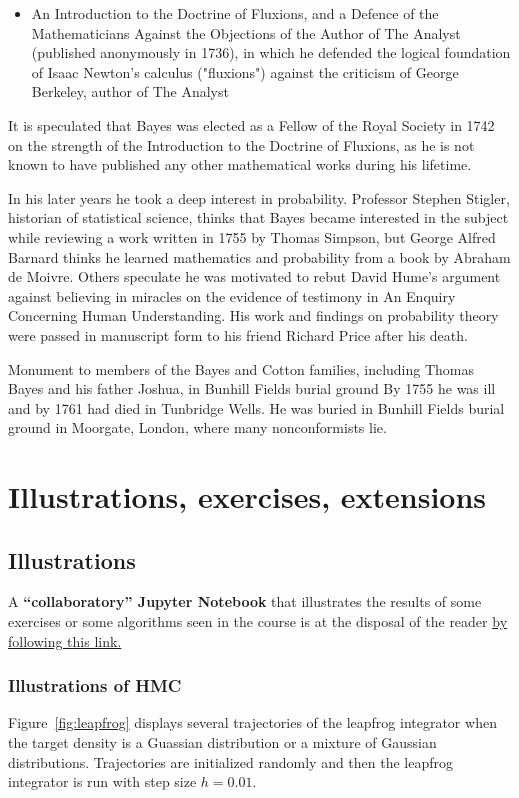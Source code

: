 \documentclass[english,graybox,envcountchap,envcountsame,sectrefs,shortlabels]{svmono}
\theoremstyle{style}
\begin{document}
\begin{subappendices}
\begin{itemize}
\item An Introduction to the Doctrine of Fluxions, and a Defence of the Mathematicians Against the Objections of the Author of The Analyst (published anonymously in 1736), in which he defended the logical foundation of Isaac Newton's calculus ("fluxions") against the criticism of George Berkeley, author of The Analyst
\end{itemize}

It is speculated that Bayes was elected as a Fellow of the Royal Society in 1742 on the strength of the Introduction to the Doctrine of Fluxions, as he is not known to have published any other mathematical works during his lifetime.

In his later years he took a deep interest in probability. Professor Stephen Stigler, historian of statistical science, thinks that Bayes became interested in the subject while reviewing a work written in 1755 by Thomas Simpson, but George Alfred Barnard thinks he learned mathematics and probability from a book by Abraham de Moivre. Others speculate he was motivated to rebut David Hume's argument against believing in miracles on the evidence of testimony in An Enquiry Concerning Human Understanding. His work and findings on probability theory were passed in manuscript form to his friend Richard Price after his death.


Monument to members of the Bayes and Cotton families, including Thomas Bayes and his father Joshua, in Bunhill Fields burial ground
By 1755 he was ill and by 1761 had died in Tunbridge Wells. He was buried in Bunhill Fields burial ground in Moorgate, London, where many nonconformists lie.
\end{subappendices}

\chapter{Illustrations, exercises, extensions}

\section{Illustrations}
A \textbf{``collaboratory'' Jupyter Notebook} that illustrates the
results of some exercises or some algorithms seen in the course is
at the disposal of the reader \href{https://colab.research.google.com/drive/1Ey5TNx-_74gPH0FG-rhXSuGGok0T10wS\#}{by following this link.}

\subsection{Illustrations of HMC}
Figure~\ref{fig:leapfrog} displays several trajectories of the leapfrog integrator when the target density is a Guassian distribution or a mixture of Gaussian distributions. Trajectories are initialized randomly and then the leapfrog integrator is run with step size $h= 0.01$.
\end{document}
